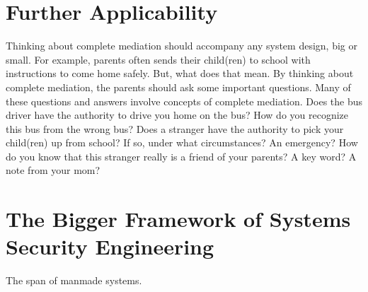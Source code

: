 \documentclass[../../main/main.tex]{subfiles}
\begin{document}
\section{Further Applicability }\label{sec:applicability }
Thinking about complete mediation should accompany any system design, big or small.  For example, parents often sends their child(ren) to school with instructions to come home safely.  But, what does that mean.  By thinking about complete mediation, the parents should ask some important questions.  Many of these questions and answers involve concepts of complete mediation.  Does the bus driver have the authority to drive you home on the bus?  How do you recognize this bus from the wrong bus?  Does a stranger have the authority to pick your child(ren) up from school?  If so, under what circumstances?  An emergency?  How do you know that this stranger really is a friend of your parents?  A key word?  A note from your mom?

\section{The Bigger Framework of Systems Security Engineering }\label{sec:bigsse }
The span of manmade systems.
\end{document}
